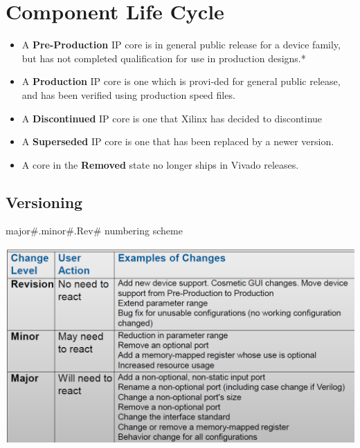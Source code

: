 \section{Component Life Cycle}
\begin{itemize}
	\item A \textbf{Pre-Production} IP core is in general public release for a device family, but has not completed qualification for use in production designs.*
	\item A \textbf{Production} IP core is one which is provi-ded for general public release, and has been verified using production speed files.
	\item A \textbf{Discontinued }IP core is one that Xilinx has decided to discontinue
	\item A \textbf{Superseded} IP core is one that has been replaced by a newer version.
	\item A core in the \textbf{Removed} state no longer ships in Vivado releases.
\end{itemize}

\subsection{Versioning}
major\#.minor\#.Rev\# numbering scheme
\begin{center}
	\includegraphics[width=\columnwidth]{Images/versioning}
\end{center}
